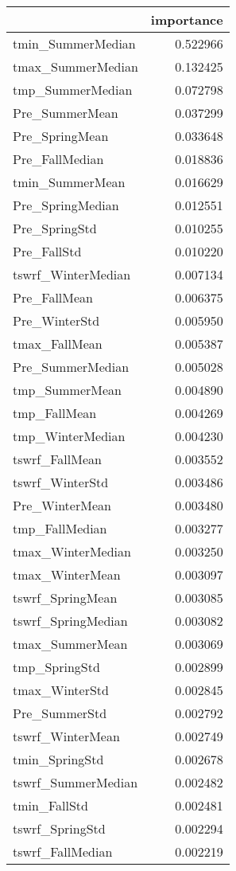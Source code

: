 \begin{tabular}{lr}
\toprule
 & importance \\
\midrule
tmin_SummerMedian & 0.522966 \\
tmax_SummerMedian & 0.132425 \\
tmp_SummerMedian & 0.072798 \\
Pre_SummerMean & 0.037299 \\
Pre_SpringMean & 0.033648 \\
Pre_FallMedian & 0.018836 \\
tmin_SummerMean & 0.016629 \\
Pre_SpringMedian & 0.012551 \\
Pre_SpringStd & 0.010255 \\
Pre_FallStd & 0.010220 \\
tswrf_WinterMedian & 0.007134 \\
Pre_FallMean & 0.006375 \\
Pre_WinterStd & 0.005950 \\
tmax_FallMean & 0.005387 \\
Pre_SummerMedian & 0.005028 \\
tmp_SummerMean & 0.004890 \\
tmp_FallMean & 0.004269 \\
tmp_WinterMedian & 0.004230 \\
tswrf_FallMean & 0.003552 \\
tswrf_WinterStd & 0.003486 \\
Pre_WinterMean & 0.003480 \\
tmp_FallMedian & 0.003277 \\
tmax_WinterMedian & 0.003250 \\
tmax_WinterMean & 0.003097 \\
tswrf_SpringMean & 0.003085 \\
tswrf_SpringMedian & 0.003082 \\
tmax_SummerMean & 0.003069 \\
tmp_SpringStd & 0.002899 \\
tmax_WinterStd & 0.002845 \\
Pre_SummerStd & 0.002792 \\
tswrf_WinterMean & 0.002749 \\
tmin_SpringStd & 0.002678 \\
tswrf_SummerMedian & 0.002482 \\
tmin_FallStd & 0.002481 \\
tswrf_SpringStd & 0.002294 \\
tswrf_FallMedian & 0.002219 \\

\end{tabular}
